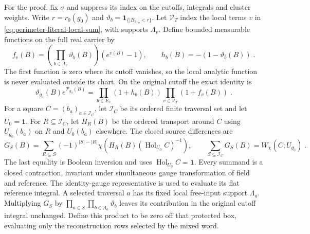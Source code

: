 \documentclass[11pt]{article}
\newcommand{\Hol}{\operatorname{Hol}}
\newcommand{\id}{\mathbf 1}
\begin{document}
For the proof, fix $\sigma$ and suppress its index on the cutoffs, integrals and cluster weights. Write $r=r_0(g_0)$ and $\vartheta_b=\mathbf1_{\{|B_b|_\sigma<r\}}$. Let $\mathcal V_T$ index the local terms $v$ in \eqref{eq:perimeter-literal-local-sum}, with supports $\Lambda_v$. Define bounded measurable functions on the full real carrier by
\begin{equation}\label{eq:marginal-local-vertices}
    f_v(B)=\left(\prod_{b\in \Lambda_v}\vartheta_b(B)\right)
        (e^{v(B)}-1),
    \qquad h_b(B)=-(1-\vartheta_b(B))\;.
\end{equation}
The first function is zero where its cutoff vanishes, so the local analytic function is never evaluated outside its chart. On the original cutoff the exact identity is
\begin{equation}\label{eq:marginal-original-weight}
    \vartheta_{g_0}(B)e^{\mathcal P_{g_0}(B)}
        =\prod_{b\in E_*}(1+h_b(B))
            \prod_{v\in \mathcal V_T}(1+f_v(B))\;.
\end{equation}
For a square $C=(b_a)_{a\in\mathcal I_C}$, let $\mathcal I_C$ be its ordered finite traversal set and let $U_0=\id$. For $R\subseteq\mathcal I_C$, let $H_R(B)$ be the ordered transport around $C$ using $U_{g_0}(b_a)$ on $R$ and $U_0(b_a)$ elsewhere. The closed source differences are
\begin{equation}\label{eq:finite-source-closed-differences}
    G_S(B)=\sum_{R\subseteq S}(-1)^{|S|-|R|}
        \chi\left(H_R(B)(\Hol_{U_0}C)^{-1}\right),
    \qquad \sum_{S\subseteq\mathcal I_C}G_S(B)
        =W_\chi(C;U_{g_0})\;.
\end{equation}
The last equality is Boolean inversion and uses $\Hol_{U_0}C=\id$. Every summand is a closed contraction, invariant under simultaneous gauge transformation of field and reference. The identity-gauge representative is used to evaluate its flat reference integral.
A selected traversal $a$ has its fixed local free-input support $\Lambda_a$. Multiplying $G_S$ by $\prod_{a\in S}\prod_{b\in \Lambda_a}\vartheta_b$ leaves its contribution in the original cutoff integral unchanged. Define this product to be zero off that protected box, evaluating only the reconstruction rows selected by the mixed word.
\end{document}
